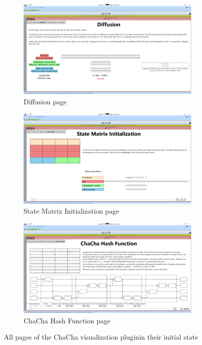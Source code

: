 \begin{figure}
\begin{subfigure}{.5\textwidth}
  \centering
  \includegraphics[width=0.99\textwidth]{figures/all-pages/3-diffusion}
  \caption{Diffusion page}
\end{subfigure}%
\begin{subfigure}{.5\textwidth}
  \centering
  \includegraphics[width=0.99\textwidth]{figures/all-pages/4-statematrix}
  \caption{State Matrix Initialization page}
\end{subfigure}

\begin{subfigure}{.5\textwidth}
  \centering
  \includegraphics[width=0.99\textwidth]{figures/all-pages/5-chachahash}
  \caption{ChaCha Hash Function page}
\end{subfigure}
\caption{All pages of the ChaCha visualization pluginin their initial state}
\label{fig:allpages}
\end{figure}


